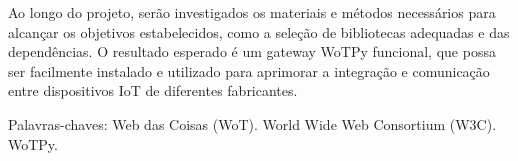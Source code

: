 \begin{resumo}
Ao longo do projeto, serão investigados os materiais e métodos necessários para alcançar os objetivos estabelecidos, como a seleção de bibliotecas adequadas e das dependências. O resultado esperado é um gateway WoTPy funcional, que possa ser facilmente instalado e utilizado para aprimorar a integração e comunicação entre dispositivos IoT de diferentes fabricantes.

Palavras-chaves: Web das Coisas (WoT). World Wide Web Consortium (W3C). WoTPy.
\end{resumo}
